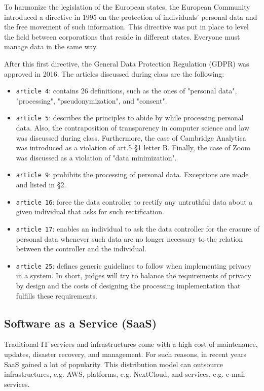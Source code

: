 To harmonize the legislation of the European states, the European Community introduced a directive in 1995 on the protection of individuals' personal data and the free movement of such information. This directive was put in place to level the field between corporations that reside in different states. Everyone must manage data in the same way.

After this first directive, the General Data Protection Regulation (GDPR) was approved in 2016. The articles discussed during class are the following:

\begin{itemize}
  \item \texttt{article 4}: contains 26 definitions, such as the ones of "personal data", "processing", "pseudonymization", and "consent".
  \item \texttt{article 5}: describes the principles to abide by while processing personal data. Also, the contraposition of transparency in computer science and law was discussed during class. Furthermore, the case of Cambridge Analytica was introduced as a violation of art.5 \S 1 letter B. Finally, the case of Zoom was discussed as a violation of "data minimization".
  \item \texttt{article 9}: prohibits the processing of personal data. Exceptions are made and listed in \S 2.
  \item \texttt{article 16}: force the data controller to rectify any untruthful data about a given individual that asks for such rectification.
  \item \texttt{article 17}: enables an individual to ask the data controller for the erasure of personal data whenever such data are no longer necessary to the relation between the controller and the individual.
  \item \texttt{article 25}: defines generic guidelines to follow when implementing privacy in a system. In short, judges will try to balance the requirements of privacy by design and the costs of designing the processing implementation that fulfills these requirements.
\end{itemize}

\subsection*{Software as a Service (SaaS)}

Traditional IT services and infrastructures come with a high cost of maintenance, updates, disaster recovery, and management. For such reasons, in recent years SaaS gained a lot of popularity. This distribution model can outsource infrastructures, e.g. AWS, platforms, e.g. NextCloud, and services, e.g. e-mail services.

